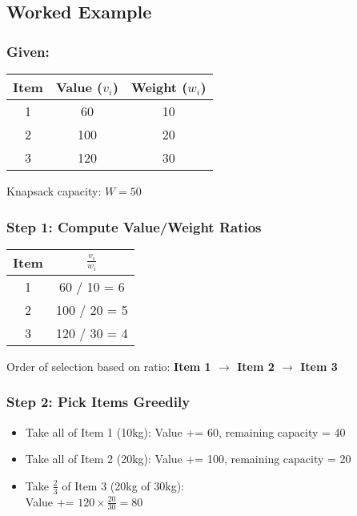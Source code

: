 \documentclass[14pt]{extarticle}
\begin{document}
\subsection{Worked Example}

\subsubsection*{Given:}

\begin{center}
\begin{tabular}{|c|c|c|}
\hline
\textbf{Item} & \textbf{Value ($v_i$)} & \textbf{Weight ($w_i$)} \\
\hline
1 & 60 & 10 \\
2 & 100 & 20 \\
3 & 120 & 30 \\
\hline
\end{tabular}
\end{center}

Knapsack capacity: $W = 50$
\subsubsection*{Step 1: Compute Value/Weight Ratios}

\begin{center}
\begin{tabular}{|c|c|}
\hline
\textbf{Item} & $\frac{v_i}{w_i}$ \\
\hline
1 & 60 / 10 = 6 \\
2 & 100 / 20 = 5 \\
3 & 120 / 30 = 4 \\
\hline
\end{tabular}
\end{center}

Order of selection based on ratio: \textbf{Item 1 $\rightarrow$ Item 2 $\rightarrow$ Item 3}
\subsubsection*{Step 2: Pick Items Greedily}

\begin{itemize}
    \item Take all of Item 1 (10kg): Value += 60, remaining capacity = 40
    \item Take all of Item 2 (20kg): Value += 100, remaining capacity = 20
    \item Take $\frac{2}{3}$ of Item 3 (20kg of 30kg): \\
          Value += $120 \times \frac{20}{30} = 80$
\end{itemize}
\end{document}
